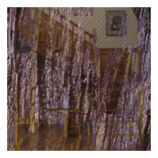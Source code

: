 \begin{figure}[]
\begin{subfigure}{\textwidth}
\begin{subfigure}{0.19\textwidth}
            \caption*{}
        \end{subfigure}
        \hfill
        \begin{subfigure}{0.19\textwidth}
            \centering
            \includegraphics[width=\textwidth]{images/04-experiment03/staircase_illum/wood/pixel_proj.jpg}
            \caption*{}
        \end{subfigure}


\end{subfigure}
\end{figure}
